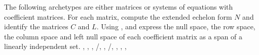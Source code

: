 The following archetypes are either matrices or systems of equations with coefficient matrices.  For each matrix, compute the extended echelon form $N$ and identify the matrices $C$ and $L$.  Using ,   and  express the null space, the row space, the column space and left null space of each coefficient matrix as a span of a linearly independent set.\newline\newline
{},
,
,
/,
,
/,
,
,
%
,


